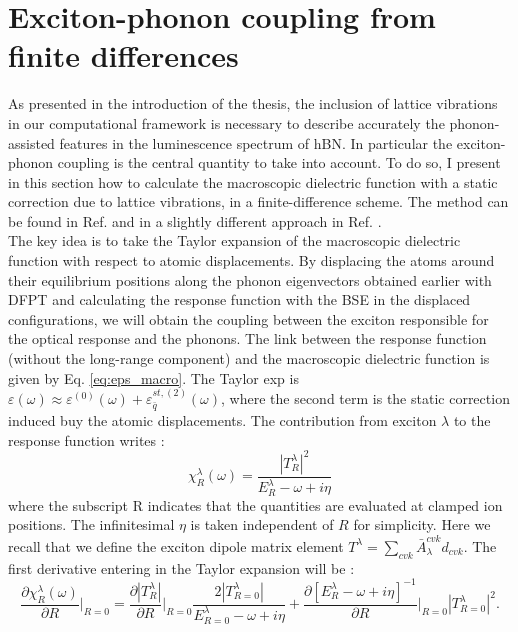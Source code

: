 \section{Exciton-phonon coupling from finite differences} \label{sec:excph_fdd}
As presented in the introduction of the thesis, the inclusion of lattice vibrations in our computational framework is necessary to describe accurately the phonon-assisted features in the luminescence spectrum of hBN. In particular the exciton-phonon coupling is the central quantity to take into account. To do so, I present in this section how to calculate the macroscopic dielectric function with a static correction due to lattice vibrations, in a finite-difference scheme. The method can be found in Ref. \cite{paleari2019exciton} and in a slightly different approach in Ref. \cite{cannuccia2019theory}.\\
The key idea is to take the Taylor expansion of the macroscopic dielectric function with respect to atomic displacements. By displacing the atoms around their equilibrium positions along the phonon eigenvectors obtained earlier with \acrshort{DFPT} and calculating the response function with the \acrshort{BSE} in the displaced configurations, we will obtain the coupling between the exciton responsible for the optical response and the phonons. The link between the response function (without the long-range component) and the macroscopic dielectric function is given by Eq. \eqref{eq:eps_macro}. 
The Taylor exp is $\varepsilon (\omega)\approx \varepsilon^{(0)}(\omega) + \varepsilon^{st,(2)}_{\bar{q}}(\omega)$, where the second term is the static correction induced buy the atomic displacements.\cite{zacharias2016one} 
The contribution from exciton $\lambda$ to the response function  writes :
\begin{equation}
	\chi^\lambda_R(\omega) = \frac{|T^\lambda_R|^2}{E^\lambda_R - \omega + i \eta} \label{eq:chi_R_lambda}
\end{equation}
where the subscript R indicates that the quantities are evaluated at clamped ion positions. The infinitesimal $\eta$ is taken independent of $R$ for simplicity. Here we recall that we define the exciton dipole matrix element $T^\lambda = \sum_{cvk} \bar{A}_\lambda^{cvk} d_{cvk}$. The first derivative entering in the Taylor expansion will be :
\begin{equation}
	\frac{\partial \chi^\lambda_R(\omega)}{\partial R}\biggr|_{R=0} = \frac{\partial |T^\lambda_R|}{\partial R}\biggr|_{R=0} \frac{2|T^\lambda_{R=0}|}{E^\lambda_{R=0} - \omega + i\eta} + \frac{\partial \left[ E^\lambda_R - \omega + i\eta \right]^{-1}}{\partial R}\biggr|_{R=0} |T^\lambda_{R=0}|^2.
\end{equation}
